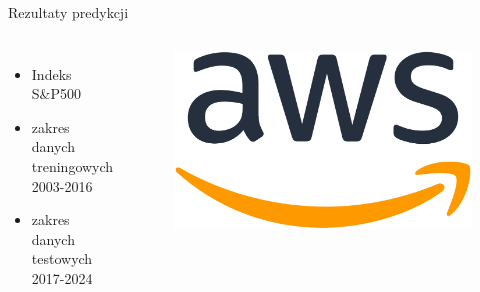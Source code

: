 \begin{frame}{Rezultaty predykcji}
    \begin{columns}[t]
            \begin{itemize}
                \item Indeks S\&P500
                \item zakres danych treningowych 2003-2016
                \item zakres danych testowych 2017-2024
            \end{itemize}
        \centering
        \begin{figure}
            \centering
            \includegraphics[width=1\textwidth]{images/aws_logo.png}
        \end{figure}    
    \end{columns}
\end{frame}
